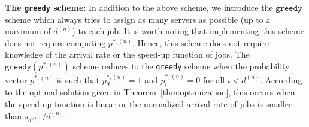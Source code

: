 \documentclass[a4paper]{article}
\theoremstyle{plain}
\theoremstyle{definition}
\theoremstyle{case}
\theoremstyle{remark}
\newcommand{\brac}[1]{\left(#1\right)}
\begin{document}
{\bf The \texttt{greedy} scheme}: 
In addition to the above scheme, we introduce the $\texttt{greedy}$ scheme which always tries to assign as many servers as possible (up to a maximum of $d^{(n)}$) to each job.
It is worth noting that implementing this scheme does not require computing $p^{*,(n)}$. Hence, this scheme does not require knowledge of the arrival rate or the speed-up function of jobs. The $\texttt{greedy}(p^{*,(n)})$ scheme reduces to the \texttt{greedy} scheme when the probability vector $p^{*,(n)}$ is such that $p^{*,(n)}_d=1$ and $p^{*,(n)}_i=0$ for all $i < d^{(n)}$. According to the optimal solution given in Theorem~\ref{thm:optimization}, this occurs when the speed-up function is linear or the normalized arrival rate of jobs is smaller than $s_{d^{(n)}}/d^{(n)}$.
%

%





\end{document}
